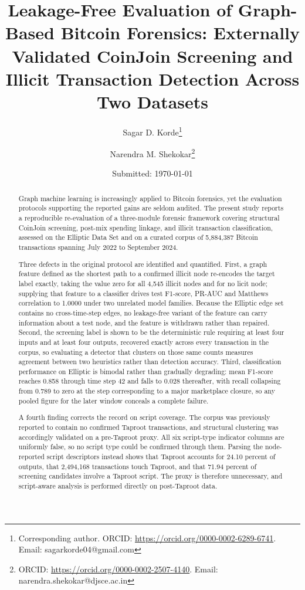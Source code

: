 \documentclass[12pt,a4paper]{article}
\title{\textbf{Leakage-Free Evaluation of Graph-Based Bitcoin
       Forensics: Externally Validated CoinJoin Screening and
       Illicit Transaction Detection Across Two Datasets}}
\author[1,2]{Sagar D. Korde\thanks{Corresponding author.
  ORCID: \url{https://orcid.org/0000-0002-6289-6741}.
  Email: sagarkorde04@gmail.com}}
\author[1]{Narendra M. Shekokar\thanks{ORCID:
  \url{https://orcid.org/0000-0002-2507-4140}.
  Email: narendra.shekokar@djsce.ac.in}}
\affil[1]{\small Department of Computer Engineering,
          Dwarkadas J. Sanghvi College of Engineering,
          Mumbai, India}
\affil[2]{\small K.\,J. Somaiya School of Engineering,
          Somaiya Vidyavihar University,
          Mumbai, India}
\date{\small Submitted: \today}
\begin{document}
\maketitle
\thispagestyle{fancy}

\begin{abstract}
\noindent
Graph machine learning is increasingly applied to Bitcoin
forensics, yet the evaluation protocols supporting the reported
gains are seldom audited. The present study reports a
reproducible re-evaluation of a three-module forensic framework
covering structural CoinJoin screening, post-mix spending
linkage, and illicit transaction classification, assessed on the
Elliptic Data Set and on a curated corpus of 5{,}884{,}387
Bitcoin transactions spanning July 2022 to September 2024.

Three defects in the original protocol are identified and
quantified. First, a graph feature defined as the shortest path
to a confirmed illicit node re-encodes the target label exactly,
taking the value zero for all 4{,}545 illicit nodes and for no
licit node; supplying that feature to a classifier drives test
F1-score, PR-AUC and Matthews correlation to 1.0000 under two
unrelated model families. Because the Elliptic edge set contains
no cross-time-step edges, no leakage-free variant of the feature
can carry information about a test node, and the feature is
withdrawn rather than repaired. Second, the screening label is
shown to be the deterministic rule requiring at least four inputs
and at least four outputs, recovered exactly across every
transaction in the corpus, so evaluating a detector that clusters
on those same counts measures agreement between two heuristics
rather than detection accuracy. Third, classification performance
on Elliptic is bimodal rather than gradually degrading: mean
F1-score reaches 0.858 through time step 42 and falls to 0.028
thereafter, with recall collapsing from 0.789 to zero at the step
corresponding to a major marketplace closure, so any pooled
figure for the later window conceals a complete failure.

A fourth finding corrects the record on script coverage. The
corpus was previously reported to contain no confirmed Taproot
transactions, and structural clustering was accordingly validated
on a pre-Taproot proxy. All six script-type indicator columns are
uniformly false, so no script type could be confirmed through
them. Parsing the node-reported script descriptors instead shows
that Taproot accounts for 24.10 percent of outputs, that
2{,}494{,}168 transactions touch Taproot, and that 71.94 percent
of screening candidates involve a Taproot script. The proxy is
therefore unnecessary, and script-aware analysis is performed
directly on post-Taproot data.


\end{abstract}
\end{document}
